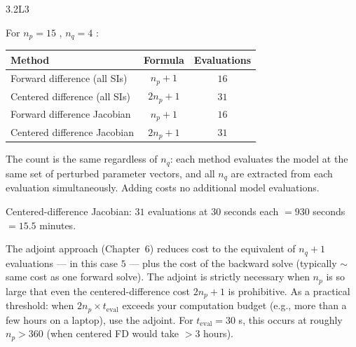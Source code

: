 \begin{solution}{3.2}{L3}

\solanswer

 For $n_p = 15$ \POIs, $n_q = 4$ \QOIs:

\begin{center}
\begin{tabular}{lcc}
\toprule
Method & Formula & Evaluations \\
\midrule
Forward difference (all SIs)  & $n_p + 1$   & $16$ \\
Centered difference (all SIs) & $2n_p + 1$  & $31$ \\
Forward difference Jacobian   & $n_p + 1$   & $16$ \\
Centered difference Jacobian  & $2n_p + 1$  & $31$ \\
\bottomrule
\end{tabular}
\end{center}

The count is the same regardless of $n_q$: each method evaluates
the model at the same set of perturbed parameter vectors, and all
$n_q$ \QOIs are extracted from each evaluation simultaneously.
Adding \QOIs costs no additional model evaluations.

 Centered-difference Jacobian: $31$ evaluations at
$30$ seconds each $= 930$ seconds $= 15.5$ minutes.

 The adjoint approach (Chapter~6) reduces cost to
the equivalent of $n_q + 1$ evaluations — in this case $5$ — plus
the cost of the backward solve (typically $\sim$same cost as one
forward solve). The adjoint is strictly necessary when $n_p$ is
so large that even the centered-difference cost $2n_p+1$ is
prohibitive. As a practical threshold: when $2n_p \times t_{\text{eval}}$
exceeds your computation budget (e.g., more than a few hours on
a laptop), use the adjoint. For $t_{\text{eval}} = 30$ s, this
occurs at roughly $n_p > 360$ (when centered FD would take $> 3$ hours).


\end{solution}

